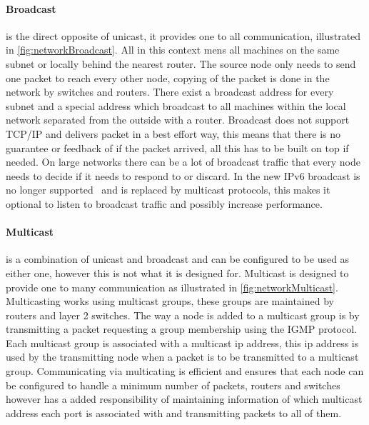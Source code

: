 \paragraph{Broadcast} is the direct opposite of unicast, it provides one to all communication, illustrated in \cref{fig:networkBroadcast}. All in this context mens all machines on the same subnet or locally behind the nearest router.
The source node only needs to send one packet to reach every other node, copying of the packet is done in the network by switches and routers.
There exist a broadcast address for every subnet and a special address which broadcast to all machines within the local network separated from the outside with a router.
Broadcast does not support TCP/IP and delivers packet in a best effort way, this means that there is no guarantee or feedback of if the packet arrived, all this has to be built on top if needed.
On large networks there can be a lot of broadcast traffic that every node needs to decide if it needs to respond to or discard.
In the new IPv6 broadcast is no longer supported~\cite{RFC4291_AddressingIPv6Draft} and is replaced by multicast protocols, this makes it optional to listen to broadcast traffic and possibly increase performance.

\paragraph{Multicast} is a combination of unicast and broadcast and can be configured to be used as either one, however this is not what it is designed for. Multicast is designed to provide one to many communication as illustrated in \cref{fig:networkMulticast}.
Multicasting works using multicast groups, these groups are maintained by routers and layer 2 switches. The way a node is added to a multicast group is by transmitting a packet requesting a group membership using the IGMP protocol. Each multicast group is associated with a multicast ip address, this ip address is used by the transmitting node when a packet is to be transmitted to a multicast group.
Communicating via multicating is efficient and ensures that each node can be configured to handle a minimum number of packets, routers and switches however has a added responsibility of maintaining information of which multicast address each port is associated with and transmitting packets to all of them.

